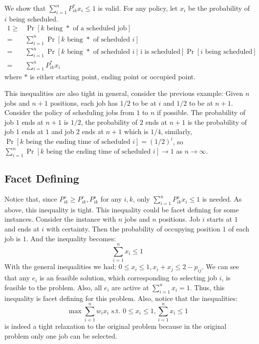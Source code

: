 \documentclass{article}
\begin{document}
We show that $\sum_{i=1}^{n}P_{ik}^* x_i\leq 1$ is valid.
For any policy, let $x_i$ be the probability of $i$ being scheduled.
\[
\begin{aligned}
1\geq &\Pr[\text{$k$ being $*$ of a scheduled job}]\\
= &\sum_{i=1}^{n}\Pr[\text{$k$ being $*$ of scheduled $i$}]\\
= &\sum_{i=1}^{n}\Pr[\text{$k$ being $*$ of scheduled $i\ |$ i is scheduled}]\Pr[\text{$i$ being scheduled}]\\
= &\sum_{i=1}^{n}P_{ik}^* x_i
 \end{aligned}
\]
where $*$ is either starting point, ending point or occupied point.

This inequalities are also tight in general, consider the previous example:
Given $n$ jobs and $n+1$ positions, each job has $1/2$ to be at $i$ and $1/2$ to be at $n+1$.
Consider the policy of scheduling jobs from $1$ to $n$ if possible.
The probability of job $1$ ends at $n+1$ is $1/2$, the probability of $2$ ends at $n+1$ is the probability of job $1$ ends at $1$ and job $2$ ends at $n+1$ which is $1/4$, similarly, $\Pr[\text{$k$ being the ending time of scheduled $i$}] = (1/2)^i$, so
$\sum_{i=1}^{n}\Pr[\text{$k$ being the ending time of scheduled $i$}]\to 1$ as $n\to\infty$.


\subsection{Facet Defining}
Notice that, since $P_{ik}^o\geq P_{ik}^e, P_{ik}^s$ for any $i,k$, only $\sum_{i=1}^{n}P_{ik}^o x_i\leq 1$ is needed.
As above, this inequality is tight.
This inequality could be facet defining for some instances.
Consider the instance with $n$ jobs and $n$ positions.
Job $i$ starts at $1$ and ends at $i$ with certainty.
Then the probability of occupying position $1$ of each job is $1$.
And the inequality becomes:
\[\sum_{i=1}^{n}x_i\leq 1\]
With the general inequalities we had: $0\leq x_i\leq 1, x_i+x_j\leq 2-p_{ij}$. 
We can see that any $e_i$ is an feasible solution, which corresponding to selecting job $i$, is feasible to the problem.
Also, all $e_i$ are active at $\sum_{i=1}^{n}x_i = 1$.
Thus, this inequality is facet defining for this problem.
Also, notice that the inequalities:
\[\max \sum_{i=1}^{n}w_ix_i\text{ s.t. }0\leq x_i\leq 1, \sum_{i=1}^{n}x_i\leq 1\]
is indeed a tight relaxation to the original problem because in the original problem only one job can be selected.
\end{document}
